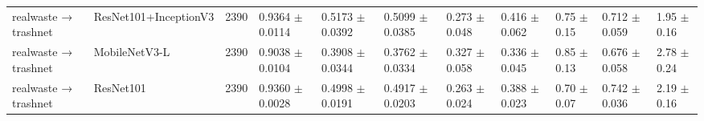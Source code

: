 \begin{table}[ht]
\begin{tabular}{lllllllllll}
realwaste → trashnet & ResNet101+InceptionV3 & 2390 & 0.9364 $\pm$ 0.0114 & 0.5173 $\pm$ 0.0392 & 0.5099 $\pm$ 0.0385 & 0.273 $\pm$ 0.048 & 0.416 $\pm$ 0.062 & 0.75 $\pm$ 0.15 & 0.712 $\pm$ 0.059 & 1.95 $\pm$ 0.16 \\
realwaste → trashnet & MobileNetV3-L & 2390 & 0.9038 $\pm$ 0.0104 & 0.3908 $\pm$ 0.0344 & 0.3762 $\pm$ 0.0334 & 0.327 $\pm$ 0.058 & 0.336 $\pm$ 0.045 & 0.85 $\pm$ 0.13 & 0.676 $\pm$ 0.058 & 2.78 $\pm$ 0.24 \\
realwaste → trashnet & ResNet101 & 2390 & 0.9360 $\pm$ 0.0028 & 0.4998 $\pm$ 0.0191 & 0.4917 $\pm$ 0.0203 & 0.263 $\pm$ 0.024 & 0.388 $\pm$ 0.023 & 0.70 $\pm$ 0.07 & 0.742 $\pm$ 0.036 & 2.19 $\pm$ 0.16 \\
\hline
\end{tabular}
\end{table}